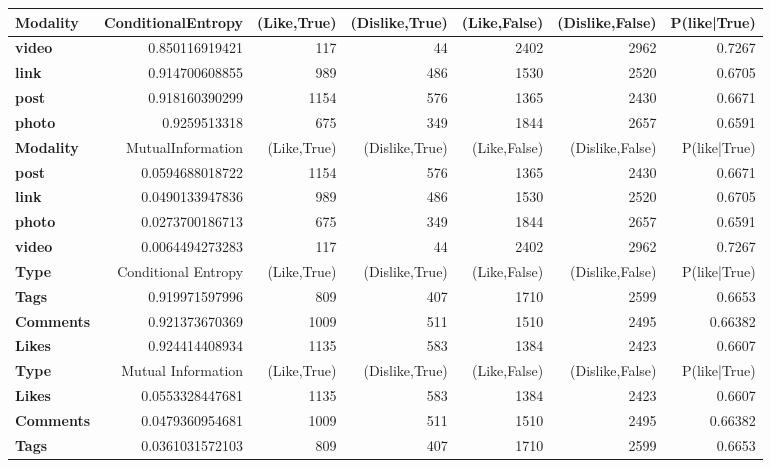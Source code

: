 \cleardoublepage
\begin{table}
	\centering
	\begin{tabular}{| >{\small}l | >{\small}r | >{\small}r | >{\small}r | >{\small}r | >{\small}r | >{\small}r |}
		\hline
		Modality & ConditionalEntropy & (Like,True) & (Dislike,True) & (Like,False) & (Dislike,False) & P(like|True)\\
		\hline
		\textbf{video} & 0.850116919421 & 117 & 44 & 2402 & 2962 & 0.7267\\
		\hline
		\textbf{link} & 0.914700608855 & 989 & 486 & 1530 & 2520 & 0.6705\\
		\hline
		\textbf{post} & 0.918160390299 & 1154 & 576 & 1365 & 2430 & 0.6671\\
		\hline
		\textbf{photo} & 0.9259513318 & 675 & 349 & 1844 & 2657 & 0.6591\\
		\hline
		\hline
		\textbf{Modality} & MutualInformation & (Like,True) & (Dislike,True) & (Like,False) & (Dislike,False) & P(like|True)\\
		\hline
		\textbf{post} & 0.0594688018722 & 1154 & 576 & 1365 & 2430 & 0.6671\\
		\hline
		\textbf{link} & 0.0490133947836 & 989 & 486 & 1530 & 2520 & 0.6705\\
		\hline
		\textbf{photo} & 0.0273700186713 & 675 & 349 & 1844 & 2657 &  0.6591\\
		\hline
		\textbf{video} & 0.0064494273283 & 117 & 44 & 2402 & 2962 & 0.7267\\
		\hline
		\hline
		\textbf{Type}  & Conditional Entropy & (Like,True) & (Dislike,True) & (Like,False) & (Dislike,False)  & P(like|True)\\
		\hline
		\textbf{Tags}  &  0.919971597996 & 809 & 407 & 1710 & 2599 & 0.6653\\
		\hline
		\textbf{Comments}  &  0.921373670369 & 1009 & 511 & 1510 & 2495 & 0.66382\\
		\hline
		\textbf{Likes}  &  0.924414408934 & 1135 & 583 & 1384 & 2423 & 0.6607\\
		\hline
		\hline
		\textbf{Type}  & Mutual Information & (Like,True) & (Dislike,True) & (Like,False) & (Dislike,False)  & P(like|True)\\
		\hline
		\textbf{Likes}  &  0.0553328447681 & 1135 & 583 & 1384 & 2423 & 0.6607\\
		\hline
		\textbf{Comments}  &  0.0479360954681 & 1009 & 511 & 1510 & 2495 & 0.66382\\
		\hline
		\textbf{Tags}  &  0.0361031572103 & 809 & 407 & 1710 & 2599 & 0.6653\\

\end{tabular}
\end{table}
